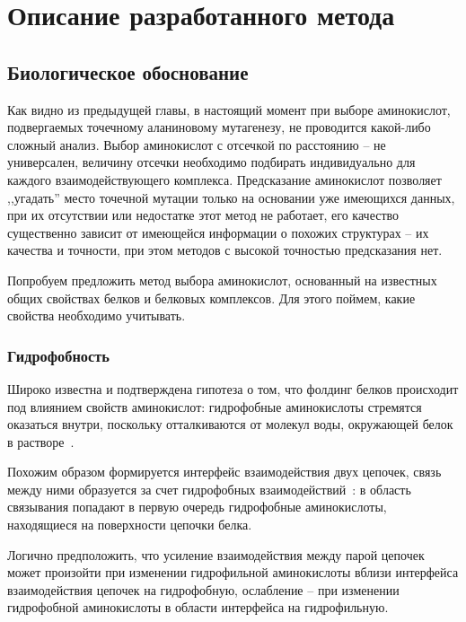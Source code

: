 \graphicspath{{../images/algorithm/}}
\chapter{Описание разработанного метода}

\section{Биологическое обоснование}
Как видно из предыдущей главы,  в настоящий момент при выборе аминокислот, подвергаемых точечному аланиновому мутагенезу, не проводится какой-либо сложный анализ. Выбор аминокислот с отсечкой по расстоянию -- не универсален, величину отсечки необходимо подбирать индивидуально для каждого взаимодействующего комплекса. Предсказание аминокислот позволяет ,,угадать'' место точечной мутации только на основании уже имеющихся данных, при их отсутствии или недостатке этот метод не работает, его качество существенно зависит от имеющейся информации о похожих структурах -- их качества и точности, при этом методов с высокой точностью предсказания нет. 

Попробуем предложить метод выбора аминокислот, основанный на известных общих свойствах белков и белковых комплексов. Для этого поймем, какие свойства необходимо учитывать.


\subsection{Гидрофобность}
Широко известна и подтверждена гипотеза о том, что фолдинг белков происходит под влиянием свойств аминокислот: гидрофобные аминокислоты стремятся оказаться внутри, поскольку отталкиваются от молекул воды, окружающей белок в растворе~\cite{hydrophobic}.

Похожим образом формируется интерфейс взаимодействия двух цепочек, связь между ними образуется за счет гидрофобных взаимодействий~\cite{hydrophobic2chain}: в область связывания попадают в первую очередь гидрофобные аминокислоты, находящиеся на поверхности цепочки белка.

Логично предположить, что усиление взаимодействия между парой цепочек может произойти при изменении гидрофильной аминокислоты вблизи интерфейса взаимодействия цепочек на гидрофобную, ослабление -- при изменении гидрофобной аминокислоты в области интерфейса на гидрофильную.

